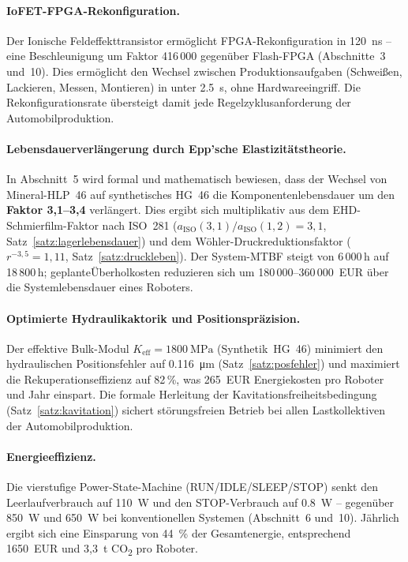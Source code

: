 ﻿\documentclass[a4paper,12pt]{scrreprt}
\theoremstyle{definition}
\begin{document}
\paragraph{IoFET-FPGA-Rekonfiguration.}
Der Ionische Feldeffekttransistor ermöglicht FPGA-Rekonfiguration
in \SI{120}{\nano\second} -- eine Beschleunigung um Faktor 416\,000
gegenüber Flash-FPGA (Abschnitte~3 und~10). Dies ermöglicht den
Wechsel zwischen Produktionsaufgaben (Schweißen, Lackieren, Messen,
Montieren) in unter \SI{2.5}{\second}, ohne Hardwareeingriff.
Die Rekonfigurationsrate übersteigt damit jede Regelzyklusanforderung
der Automobilproduktion.

\paragraph{Lebensdauerverlängerung durch Epp'sche Elastizitätstheorie.}
In Abschnitt~5 wird formal und mathematisch bewiesen, dass der Wechsel
von Mineral-HLP~46 auf synthetisches HG~46 die Komponentenlebensdauer
um den \textbf{Faktor 3{,}1--3{,}4} verlängert. Dies ergibt sich
multiplikativ aus dem EHD-Schmierfilm-Faktor nach ISO~281
($a_{\text{ISO}}(3{,}1)/a_{\text{ISO}}(1{,}2) = 3{,}1$,
Satz~\ref{satz:lagerlebensdauer}) und dem Wöhler-Druckreduktionsfaktor
($r^{-3{,}5} = 1{,}11$, Satz~\ref{satz:druckleben}).
Der System-MTBF steigt von 6\,000\,h auf 18\,800\,h;
geplanteÜberholkosten reduzieren sich um 180\,000--360\,000~EUR
über die Systemlebensdauer eines Roboters.

\paragraph{Optimierte Hydraulikaktorik und Positionspräzision.}
Der effektive Bulk-Modul $K_{\text{eff}} = \SI{1800}{\mega\pascal}$
(Synthetik~HG~46) minimiert den hydraulischen Positionsfehler
auf \SI{0.116}{\micro\meter} (Satz~\ref{satz:posfehler}) und
maximiert die Rekuperationseffizienz auf 82\,\%, was 265~EUR
Energiekosten pro Roboter und Jahr einspart.
Die formale Herleitung der Kavitationsfreiheitsbedingung
(Satz~\ref{satz:kavitation}) sichert störungsfreien Betrieb
bei allen Lastkollektiven der Automobilproduktion.

\paragraph{Energieeffizienz.}
Die vierstufige Power-State-Machine (RUN/IDLE/SLEEP/STOP) senkt
den Leerlaufverbrauch auf \SI{110}{\watt} und den STOP-Verbrauch
auf \SI{0.8}{\watt} -- gegenüber \SI{850}{\watt} und \SI{650}{\watt}
bei konventionellen Systemen (Abschnitt~6 und~10). Jährlich ergibt
sich eine Einsparung von \SI{44}{\percent} der Gesamtenergie,
entsprechend 1650~EUR und 3{,}3~t CO\textsubscript{2} pro Roboter.
\end{document}
